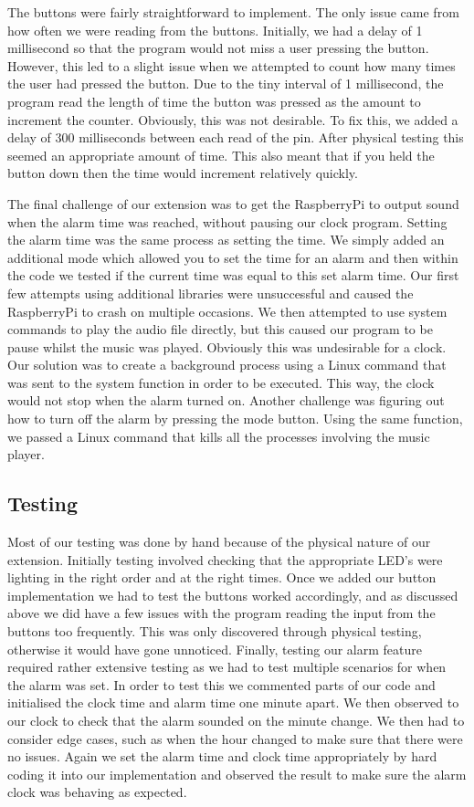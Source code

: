 \documentclass[11pt]{article}
\begin{document}
The buttons were fairly straightforward to implement. The only issue came from how often we were reading from the buttons. Initially, we had a delay of 1 millisecond so that the program would not miss a user pressing the button. However, this led to a slight issue when we attempted to count how many times the user had pressed the button. Due to the tiny interval of 1 millisecond, the program read the length of time the button was pressed as the amount to increment the counter. Obviously, this was not desirable. To fix this, we added a delay of 300 milliseconds between each read of the pin. After physical testing this seemed an appropriate amount of time. This also meant that if you held the button down then the time would increment relatively quickly.\par

The final challenge of our extension was to get the RaspberryPi to output sound when the alarm time was reached, without pausing our clock program. Setting the alarm time was the same process as setting the time. We simply added an additional mode which allowed you to set the time for an alarm and then within the code we tested if the current time was equal to this set alarm time. Our first few attempts using additional libraries were unsuccessful and caused the RaspberryPi to crash on multiple occasions. We then attempted to use system commands to play the audio file directly, but this caused our program to be pause whilst the music was played. Obviously this was undesirable for a clock. Our solution was to create a background process using a Linux command that was sent to the system function in order to be executed. This way, the clock would not stop when the alarm turned on. Another challenge was figuring out how to turn off the alarm by pressing the mode button. Using the same function, we passed a Linux command that kills all the processes involving the music player.

\subsection{Testing}
Most of our testing was done by hand because of the physical nature of our extension. Initially testing involved checking that the appropriate LED’s were lighting in the right order and at the right times. Once we added our button implementation we had to test the buttons worked accordingly, and as discussed above we did have a few issues with the program reading the input from the buttons too frequently. This was only discovered through physical testing, otherwise it would have gone unnoticed. Finally, testing our alarm feature required rather extensive testing as we had to test multiple scenarios for when the alarm was set. In order to test this we commented parts of our code and initialised the clock time and alarm time one minute apart. We then observed to our clock to check that the alarm sounded on the minute change. We then had to consider edge cases, such as when the hour changed to make sure that there were no issues. Again we set the alarm time and clock time appropriately by hard coding it into our implementation and observed the result to make sure the alarm clock was behaving as expected. 
\end{document}
